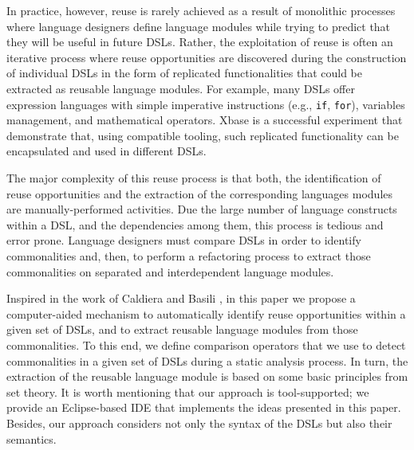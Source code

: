 In practice, however, reuse is rarely achieved as a result of monolithic processes where language designers define language modules while trying to predict that they will be useful in future DSLs. Rather, the exploitation of reuse is often an iterative process where reuse opportunities are discovered during the construction of individual DSLs in the form of replicated functionalities that could be extracted as reusable language modules. For example, many DSLs offer expression languages with simple imperative instructions (e.g., \texttt{if}, \texttt{for}), variables management, and mathematical operators. Xbase \cite{Bettini:2013} is a successful experiment that demonstrate that, using compatible tooling, such replicated functionality can be  encapsulated and used in different DSLs.

The major complexity of this reuse process is that both, the identification of reuse opportunities and the extraction of the corresponding languages modules are manually-performed activities. Due the large number of language constructs within a DSL, and the dependencies among them, this process is tedious and error prone. Language designers must compare DSLs in order to identify commonalities and, then, to perform a refactoring process to extract those commonalities on separated and interdependent language modules. 

Inspired in the work of Caldiera and Basili \cite{Caldiera:1991}, in this paper we propose a computer-aided mechanism to automatically identify reuse opportunities within a given set of DSLs, and to extract reusable language modules from those commonalities. To this end, we define comparison operators that we use to detect commonalities in a given set of DSLs during a static analysis process. In turn, the extraction of the reusable language module is based on some basic principles from set theory. It is worth mentioning that our approach is tool-supported; we provide an Eclipse-based IDE that implements the ideas presented in this paper. Besides, our approach considers not only the syntax of the DSLs but also their semantics.


